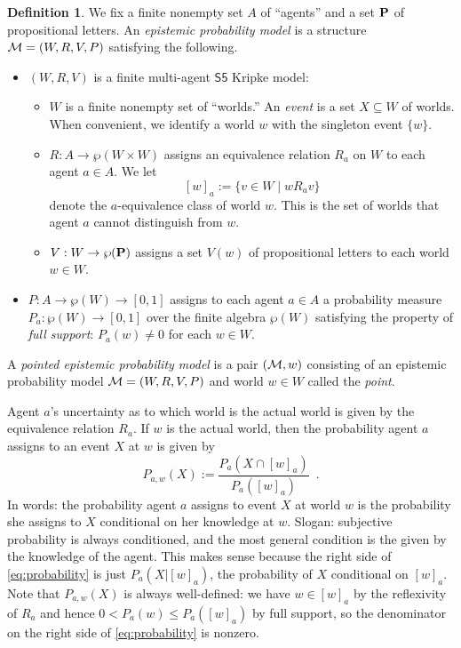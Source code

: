 \documentclass[12pt]{article}
\theoremstyle{definition}
\newtheorem{definition}[theorem]{Definition}
\newcommand{\M}{{\cal M}}      %
\newcommand{\Prop}{{\bf P}}    %
\begin{document}
\begin{definition}
  \label{definition:epistemic-probability-model}
  We fix a finite nonempty set $A$ of ``agents'' and a set $\Prop$ of
  propositional letters.  An \emph{epistemic probability model} is a
  structure $\M=(W,R,V,P)$ satisfying the following.
  \begin{itemize} 
  \item $(W,R,V)$ is a finite multi-agent $\mathsf{S5}$ Kripke model:
    \begin{itemize}
    \item $W$ is a finite nonempty set of ``worlds.''  An \emph{event}
      is a set $X\subseteq W$ of worlds.  When convenient, we identify a world
      $w$ with the singleton event $\{w\}$.
      
    \item $R:A\to\wp(W\times W)$ assigns an equivalence relation $R_a$
      on $W$ to each agent $a\in A$.  We let
      \[
      [w]_a:=\{v\in W\mid wR_av\}
      \]
      denote the $a$-equivalence class of world $w$.  This is the
      set of worlds that agent $a$ cannot distinguish from $w$.

    \item $V:W\to\wp(\Prop)$ assigns a set $V(w)$ of propositional
      letters to each world $w\in W$.
    \end{itemize}

  \item $P:A \to\wp(W)\to[0,1]$ assigns to each agent $a\in A$ a
    probability measure $P_a:\wp(W)\to[0,1]$ over the finite algebra
    $\wp(W)$ satisfying the property of \emph{full support\/}:
    $P_a(w)\neq0$ for each $w\in W$.
  \end{itemize}
  A \emph{pointed epistemic probability model} is a pair $(\M,w)$
  consisting of an epistemic probability model $\M=(W,R,V,P)$ and
  world $w\in W$ called the \emph{point}.
\end{definition}

Agent $a$'s uncertainty as to which world is the actual world
is given by the equivalence relation $R_a$. 
If $w$ is the actual world, then the probability agent
$a$ assigns to an event $X$ at $w$ is given by
\begin{equation}
  P_{a,w}(X) := \frac{P_a(X\cap[w]_a)}{P_a([w]_a)}\enspace.
  \label{eq:probability}
\end{equation}
In words: the probability agent $a$ assigns to event $X$ at world $w$
is the probability she assigns to $X$ conditional on her knowledge at
$w$. Slogan: subjective probability is always conditioned, and the
most general condition is the given by the knowledge of the
agent. This makes sense because the right side of
\eqref{eq:probability} is just $P_a(X|[w]_a)$, the probability of $X$
conditional on $[w]_a$.  Note that $P_{a,w}(X)$ is always
well-defined: we have $w\in[w]_a$ by the reflexivity of $R_a$ and
hence $0<P_a(w)\leq P_a([w]_a)$ by full support, so the denominator on
the right side of \eqref{eq:probability} is nonzero.
\end{document}
